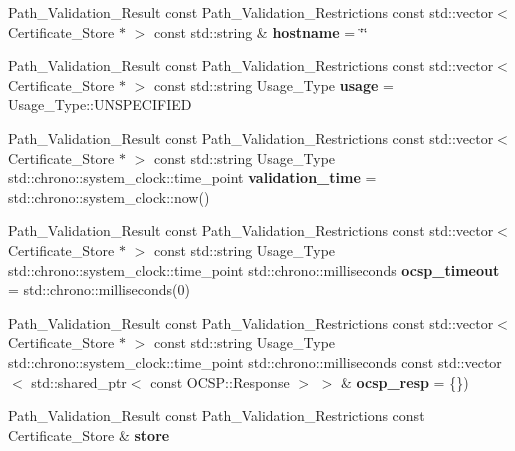 \begin{DoxyCompactItemize}
\item 
\mbox{\label{namespace_botan_a4de2cbfe29cb7de1b122c86642ee788e}} 
Path\+\_\+\+Validation\+\_\+\+Result const Path\+\_\+\+Validation\+\_\+\+Restrictions const std\+::vector$<$ Certificate\+\_\+\+Store $\ast$ $>$ const std\+::string \& {\bfseries hostname} = \char`\"{}\char`\"{}
\item 
\mbox{\label{namespace_botan_a65f0b90cebd01df11f3739504f9c14a7}} 
Path\+\_\+\+Validation\+\_\+\+Result const Path\+\_\+\+Validation\+\_\+\+Restrictions const std\+::vector$<$ Certificate\+\_\+\+Store $\ast$ $>$ const std\+::string Usage\+\_\+\+Type {\bfseries usage} = Usage\+\_\+\+Type\+::\+U\+N\+S\+P\+E\+C\+I\+F\+I\+ED
\item 
\mbox{\label{namespace_botan_aa3a1fc779e3d2fec06960301c8c54e2f}} 
Path\+\_\+\+Validation\+\_\+\+Result const Path\+\_\+\+Validation\+\_\+\+Restrictions const std\+::vector$<$ Certificate\+\_\+\+Store $\ast$ $>$ const std\+::string Usage\+\_\+\+Type std\+::chrono\+::system\+\_\+clock\+::time\+\_\+point {\bfseries validation\+\_\+time} = std\+::chrono\+::system\+\_\+clock\+::now()
\item 
\mbox{\label{namespace_botan_a930de75bf8dfd0bed638010fbe439fdc}} 
Path\+\_\+\+Validation\+\_\+\+Result const Path\+\_\+\+Validation\+\_\+\+Restrictions const std\+::vector$<$ Certificate\+\_\+\+Store $\ast$ $>$ const std\+::string Usage\+\_\+\+Type std\+::chrono\+::system\+\_\+clock\+::time\+\_\+point std\+::chrono\+::milliseconds {\bfseries ocsp\+\_\+timeout} = std\+::chrono\+::milliseconds(0)
\item 
\mbox{\label{namespace_botan_ab696068d6099063b8ce1fe7a638f60ed}} 
Path\+\_\+\+Validation\+\_\+\+Result const Path\+\_\+\+Validation\+\_\+\+Restrictions const std\+::vector$<$ Certificate\+\_\+\+Store $\ast$ $>$ const std\+::string Usage\+\_\+\+Type std\+::chrono\+::system\+\_\+clock\+::time\+\_\+point std\+::chrono\+::milliseconds const std\+::vector$<$ std\+::shared\+\_\+ptr$<$ const O\+C\+S\+P\+::\+Response $>$ $>$ \& {\bfseries ocsp\+\_\+resp} = \{\})
\item 
\mbox{\label{namespace_botan_a3f45b0b77fb49e557911a77e2b6845bf}} 
Path\+\_\+\+Validation\+\_\+\+Result const Path\+\_\+\+Validation\+\_\+\+Restrictions const Certificate\+\_\+\+Store \& {\bfseries store}
\end{DoxyCompactItemize}


